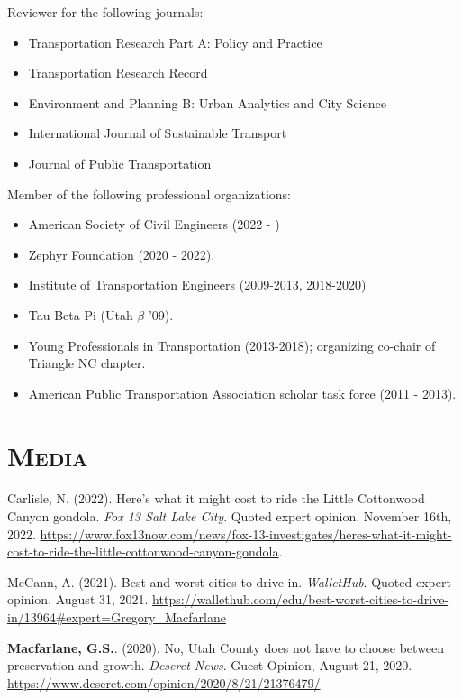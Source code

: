 \documentclass[margin,line]{res}
\newcommand{\secfont}{\scshape }
\begin{document}
\begin{resume}
Reviewer for the following journals:

\begin{itemize}
  \item Transportation Research Part A: Policy and Practice
  \item Transportation Research Record
  \item Environment and Planning B: Urban Analytics and City Science
  \item International Journal of Sustainable Transport
  \item Journal of Public Transportation
\end{itemize}

Member of the following professional organizations:

\begin{itemize}
  \item American Society of Civil Engineers (2022 - )
  \item Zephyr Foundation (2020 - 2022).
  \item Institute of Transportation Engineers (2009-2013, 2018-2020)
  \item Tau Beta Pi (Utah $\beta$ '09).
  \item Young Professionals in Transportation (2013-2018); organizing co-chair of
Triangle NC chapter.
  \item American Public Transportation Association scholar task force (2011 - 2013).
\end{itemize}

\noindent\makebox[\linewidth]{\rule{\linewidth}{0.4pt}}

\section{\secfont Media}

Carlisle, N. (2022). Here’s what it might cost to ride the Little Cottonwood Canyon gondola. \textit{Fox 13 Salt Lake City}. Quoted expert opinion. November 16th, 2022. \url{https://www.fox13now.com/news/fox-13-investigates/heres-what-it-might-cost-to-ride-the-little-cottonwood-canyon-gondola}.

McCann, A. (2021). Best and worst cities to drive in. \textit{WalletHub}. Quoted expert opinion. August 31, 2021. \url{https://wallethub.com/edu/best-worst-cities-to-drive-in/13964#expert=Gregory_Macfarlane}

\textbf{Macfarlane, G.S.}. (2020). No, Utah County does not have to choose between preservation and growth. \textit{Deseret News}. Guest Opinion, August 21, 2020. \url{https://www.deseret.com/opinion/2020/8/21/21376479/}


\end{resume}
\end{document}
